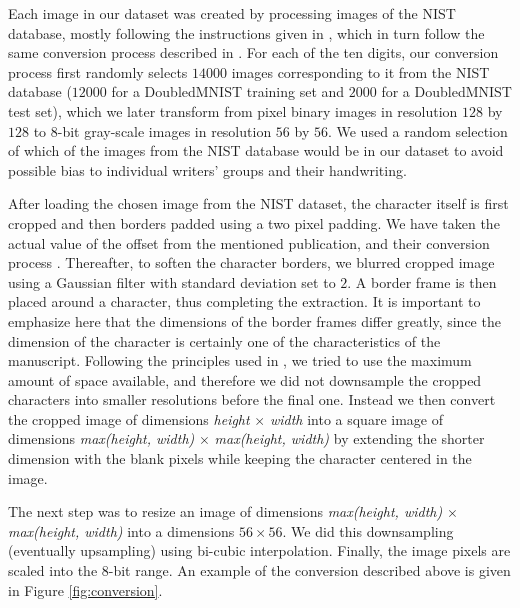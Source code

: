 \documentclass[eng]{simposium}
\begin{document}
Each image in our dataset was created by processing images of the NIST database,  
mostly following the instructions given in \cite{1}, which in turn follow the same conversion process described in \cite{8}.  
For each of the ten digits, our conversion process first randomly selects $14000$ images corresponding to it from the NIST  
database ($12000$ for a DoubledMNIST training set and $2000$ for a DoubledMNIST test set), which we later transform  
from pixel binary images in resolution $128$ by $128$ to 8-bit gray-scale images in resolution $56$ by $56$.  
We used a random selection of which of the images from the NIST database would be in our dataset to avoid possible  
bias to individual writers' groups and their handwriting.  

After loading the chosen image from the NIST dataset, the character itself is first cropped and then borders padded using a two pixel padding.  
We have taken the actual value of the offset from the mentioned publication, and their conversion process \cite{1}.  
Thereafter, to soften the character borders, we blurred cropped image using a Gaussian filter with standard deviation set to $2$.  
A border frame is then placed around a character, thus completing the extraction. 
It is important to emphasize here that the dimensions of the border frames differ greatly, since the dimension of the  
character is certainly one of the characteristics of the manuscript.  
Following the principles used in \cite{1}, we tried to use the maximum amount of space available, and  
therefore we did not downsample the cropped characters into smaller resolutions before the final one.  
Instead we then convert the cropped image of dimensions \textit{height} $\times$ \textit{width} into a square image of dimensions  
\textit{max(height, width)} $\times$ \textit{max(height, width)} by extending the shorter dimension with the blank pixels  
while keeping the character centered in the image.  

The next step was to resize an image of dimensions \textit{max(height, width)} $\times$ \textit{max(height, width)} into a  
dimensions $56 \times 56$. 
We did this downsampling (eventually upsampling) using bi-cubic interpolation.  
Finally, the image pixels are scaled into the 8-bit range.  
An example of the conversion described above is given in Figure \ref{fig:conversion}.  
\end{document}
